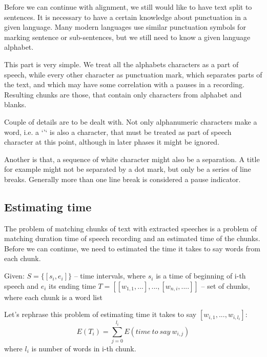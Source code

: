 \documentclass[12pt,a4paper,english]{article}
\begin{document}
Before we can continue with alignment, we still would like to have text split to sentences. It is necessary to have a certain knowledge about punctuation in a given language.  Many modern languages use similar punctuation symbols for marking sentence or sub-sentences,
but we still need to know a given language alphabet. \newline

This part is very simple. We treat all the alphabets characters as a part of speech, while every other character as punctuation mark, which separates parts of the text, and which may have some correlation with a pauses in a recording. Resulting chunks are those, that contain only characters from alphabet and blanks. \newline

Couple of details are to be dealt with. Not only alphanumeric characters make a word, i.e. a `'` is also a character, that must be treated as part of speech character at this point, although in later phases it might be ignored. \newline

Another is that, a sequence of white character might also be a separation. A title for example might not be separated by a dot mark, but only be a series of line breaks. Generally more than one line break is considered a pause indicator. \newline

\newpage

\subsection{Estimating time}

The problem of matching chunks of text with extracted speeches is a problem of matching duration time of speech recording and
an estimated time of the chunks. Before we can continue, we need to estimated the time it takes to say words from each chunk. \newline

Given: \newline
	 $S=\{[s_i, e_i]\}$	– time intervals, where $s_i$ is a time of beginning of i-th speech and $e_i$ its ending time  \newline
	 $T = [[w_{1, 1}, ...], ..., [w_{n, i}, ....] ]$	– set of chunks, where each chunk is a word list \newline

Let's rephrase this problem of estimating time it takes to say $[w_{i, 1}, ..., w_{i, l_i}]$:
\begin {equation}
    E(T_i) = \sum_{j=0}^{l_i} E(time \: to \: say \: w_{i, j})
\end {equation}
where $l_i$ is number of words in i-th chunk. \newline
\end{document}
